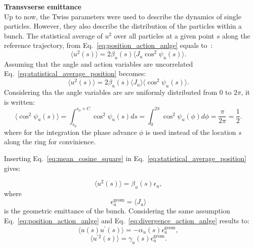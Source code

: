 \textbf{Transvserse emittance}\\
Up to now, the Twiss parameters were used to describe the dynamics of single particles. However, they also describe the distribution of the particles within a bunch. The statistical average of $u^2$ over all particles at a given point $s$ along the reference trajectory, from Eq.~\eqref{eq:position_action_anlge} equals to~\cite{wolski2014}:
\begin{equation}\label{eq:statistical_average_position}
    \langle u^2(s) \rangle = 2 \beta_u(s) \langle J_u \cos^2{\psi_u(s)} \rangle.
\end{equation}
Assuming that the angle and action variables are uncorrelated Eq.~\eqref{eq:statistical_average_position} becomes:
\begin{equation}\label{eq:statistical_average_position_2}
    \langle u^2(s) \rangle = 2 \beta_u(s) \langle J_u \rangle \langle \cos^2{\psi_u(s)} \rangle.
\end{equation}
Considering tha the angle variables are are uniformly distributed from 0 to $2\pi$, it is written: %
\begin{equation}\label{eq:mean_cosine_square}
    \langle \cos^2{\psi_u(s)} \rangle = \int_{s_0}^{s_0+C} \cos^2{\psi_u(s)} ds =   \int_0^{2\pi} \cos^2{\psi_u(\phi)} d\phi = \frac{\pi}{2\pi} = \frac{1}{2}.
\end{equation}
where for the integration the phase advance $\phi$ is used instead of the location $s$ along the ring for convinience. %

Inserting Eq.~\eqref{eq:mean_cosine_square} in Eq.~\eqref{eq:statistical_average_position} gives:

\begin{equation}\label{eq:emittance_definition_1}
    \langle u^2(s) \rangle = \beta_u(s) \epsilon_u,
\end{equation}
where
\begin{equation}\label{eq:geom_emittance_action}
    \epsilon^{\mathrm{geom}}_u=\langle J_u \rangle
\end{equation}
is the geometric emittance of the bunch. Considering the same assumption Eq.~\eqref{eq:position_action_anlge} and  Eq.~\eqref{eq:divergence_action_anlge} results to:
\begin{equation}\label{eq:u_uprime_eq_1}
    \langle u(s) u^\prime(s) \rangle = - \alpha_u(s) \epsilon^{\mathrm{geom}}_u,
\end{equation}
\begin{equation}\label{eq:u_uprime_eq_2}
    \langle u^{\prime 2}(s) \rangle = \gamma_u(s) \epsilon^{\mathrm{geom}}_u.
\end{equation}


